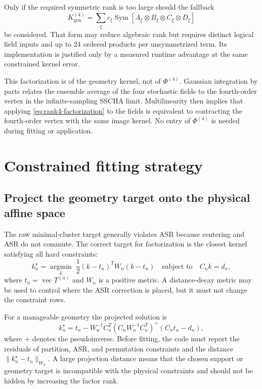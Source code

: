 \documentclass{article}
\begin{document}
Only if the required symmetric rank is too large should the fallback
\begin{equation}
    K^{(4)}_{\mathrm{gen}}
    =
    \sum_\xi c_\xi
    \operatorname{Sym}
    [A_\xi\otimes B_\xi\otimes C_\xi\otimes D_\xi]
    \label{eq:rank4-distinct-fallback}
\end{equation}
be considered. That form may reduce algebraic rank but requires distinct
logical field inputs and up to 24 ordered products per unsymmetrized term.
Its implementation is justified only by a measured runtime advantage at
the same constrained kernel error.

This factorization is of the geometry kernel, not of $\Phi^{(4)}$. Gaussian
integration by parts relates the ensemble average of the four stochastic
fields to the fourth-order vertex in the infinite-sampling SSCHA limit.
Multilinearity then implies that applying
\autoref{eq:rank4-factorization} to the fields is equivalent to contracting
the fourth-order vertex with the same image kernel. No entry of
$\Phi^{(4)}$ is needed during fitting or application.

\section{Constrained fitting strategy}
\label{sec:fitting}

\subsection{Project the geometry target onto the physical affine space}
\label{sec:projection}

The raw minimal-cluster target generally violates ASR because centering and
ASR do not commute. The correct target for factorization is the closest
kernel satisfying all hard constraints:
\begin{equation}
    k_n^\star
    =
    \underset{k}{\operatorname{argmin}}\;
    \frac{1}{2}(k-t_n)^T W_n(k-t_n)
    \quad\text{subject to}\quad
    C_nk=d_n,
    \label{eq:affine-projection}
\end{equation}
where $t_n=\operatorname{vec}T^{(n)}$ and $W_n$ is a positive metric.
A distance-decay metric may be used to control where the ASR correction is
placed, but it must not change the constraint rows.

For a manageable geometry the projected solution is
\begin{equation}
    k_n^\star
    =
    t_n-W_n^{-1}C_n^T
    \left(C_nW_n^{-1}C_n^T\right)^+
    (C_nt_n-d_n),
    \label{eq:projection-solution}
\end{equation}
where $+$ denotes the pseudoinverse. Before fitting, the code must report
the residuals of partition, ASR, and permutation constraints and the
distance $\|k_n^\star-t_n\|_{W_n}$. A large projection distance means that
the chosen support or geometry target is incompatible with the physical
constraints and should not be hidden by increasing the factor rank.
\end{document}

